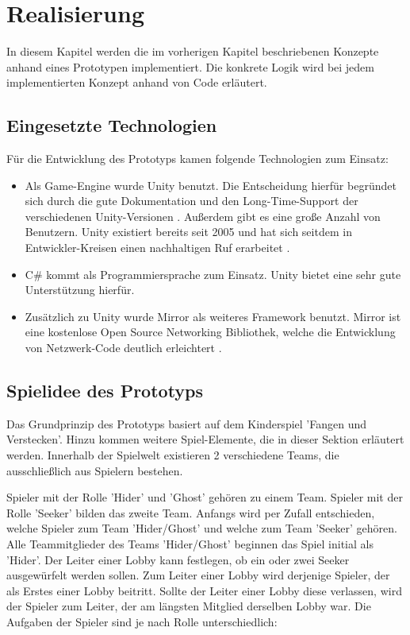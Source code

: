 \chapter{Realisierung}
\label{sec:realisierung}

In diesem Kapitel werden die im vorherigen Kapitel beschriebenen Konzepte anhand eines Prototypen implementiert. Die konkrete Logik wird bei jedem implementierten Konzept anhand von Code erläutert.

\section{Eingesetzte Technologien}

Für die Entwicklung des Prototyps kamen folgende Technologien zum Einsatz:

\begin{itemize}
	\item Als Game-Engine wurde Unity benutzt. Die Entscheidung hierfür begründet sich durch die gute Dokumentation und den Long-Time-Support der verschiedenen Unity-Versionen \cite{Technologies.03.02.2022}. Außerdem gibt es eine große Anzahl von Benutzern. Unity existiert bereits seit 2005 und hat sich seitdem in Entwickler-Kreisen einen nachhaltigen Ruf erarbeitet \cite{W.LinLin.2017}.
	\item C\# kommt als Programmiersprache zum Einsatz. Unity bietet eine sehr gute Unterstützung hierfür.
	\item Zusätzlich zu Unity wurde Mirror als weiteres Framework benutzt. Mirror ist eine kostenlose Open Source Networking Bibliothek, welche die Entwicklung von Netzwerk-Code deutlich erleichtert \cite{.03.02.2022}.
\end{itemize}

\section{Spielidee des Prototyps}
\label{Spielidee}

Das Grundprinzip des Prototyps basiert auf dem Kinderspiel 'Fangen und Verstecken'. Hinzu kommen weitere Spiel-Elemente, die in dieser Sektion erläutert werden. Innerhalb der Spielwelt existieren 2 verschiedene Teams, die ausschließlich aus Spielern bestehen.

Spieler mit der Rolle 'Hider' und 'Ghost' gehören zu einem Team.  Spieler mit der Rolle 'Seeker' bilden das zweite Team. Anfangs wird per Zufall entschieden, welche Spieler zum Team 'Hider/Ghost' und welche zum Team 'Seeker' gehören. Alle Teammitglieder des Teams 'Hider/Ghost' beginnen das Spiel initial als 'Hider'. Der Leiter einer Lobby kann festlegen, ob ein oder zwei Seeker ausgewürfelt werden sollen. Zum Leiter einer Lobby wird derjenige Spieler, der als Erstes einer Lobby beitritt. Sollte der Leiter einer Lobby diese verlassen, wird der Spieler zum Leiter, der am längsten Mitglied derselben Lobby war. Die Aufgaben der Spieler sind je nach Rolle unterschiedlich:

